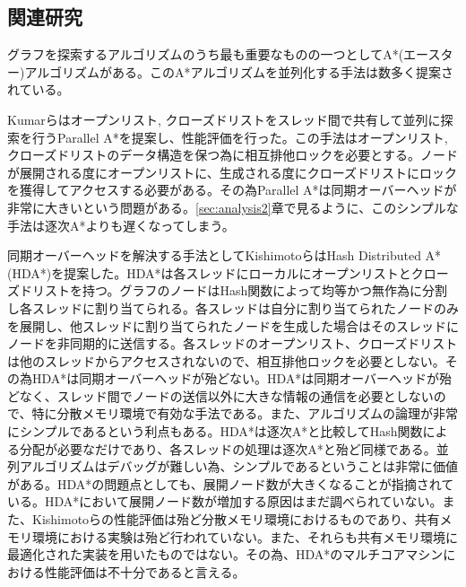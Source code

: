 \documentclass[uplatex]{jsarticle}
\begin{document}
\subsection{関連研究}

グラフを探索するアルゴリズムのうち最も重要なものの一つとしてA*(エースター)アルゴリズムがある\cite{Hart1968}。このA*アルゴリズムを並列化する手法は数多く提案されている。
\newline

Kumarらはオープンリスト, クローズドリストをスレッド間で共有して並列に探索を行うParallel A*を提案し、性能評価を行った\cite{Kumar1988parallel}。この手法はオープンリスト, クローズドリストのデータ構造を保つ為に相互排他ロックを必要とする。ノードが展開される度にオープンリストに、生成される度にクローズドリストにロックを獲得してアクセスする必要がある。その為Parallel A*は同期オーバーヘッドが非常に大きいという問題がある。\ref{sec:analysis2}章で見るように、このシンプルな手法は逐次A*よりも遅くなってしまう。
\newline


同期オーバーヘッドを解決する手法としてKishimotoらはHash Distributed A*(HDA*)を提案した\cite{Kishimoto2013}。HDA*は各スレッドにローカルにオープンリストとクローズドリストを持つ。グラフのノードはHash関数によって均等かつ無作為に分割し各スレッドに割り当てられる。各スレッドは自分に割り当てられたノードのみを展開し、他スレッドに割り当てられたノードを生成した場合はそのスレッドにノードを非同期的に送信する。各スレッドのオープンリスト、クローズドリストは他のスレッドからアクセスされないので、相互排他ロックを必要としない。その為HDA*は同期オーバーヘッドが殆どない。HDA*は同期オーバーヘッドが殆どなく、スレッド間でノードの送信以外に大きな情報の通信を必要としないので、特に分散メモリ環境で有効な手法である。また、アルゴリズムの論理が非常にシンプルであるという利点もある。HDA*は逐次A*と比較してHash関数による分配が必要なだけであり、各スレッドの処理は逐次A*と殆ど同様である。並列アルゴリズムはデバッグが難しい為、シンプルであるということは非常に価値がある。HDA*の問題点としても、展開ノード数が大きくなることが指摘されている。HDA*において展開ノード数が増加する原因はまだ調べられていない。また、Kishimotoらの性能評価は殆ど分散メモリ環境におけるものであり、共有メモリ環境における実験は殆ど行われていない。また、それらも共有メモリ環境に最適化された実装を用いたものではない。その為、HDA*のマルチコアマシンにおける性能評価は不十分であると言える。
\newline
\end{document}
